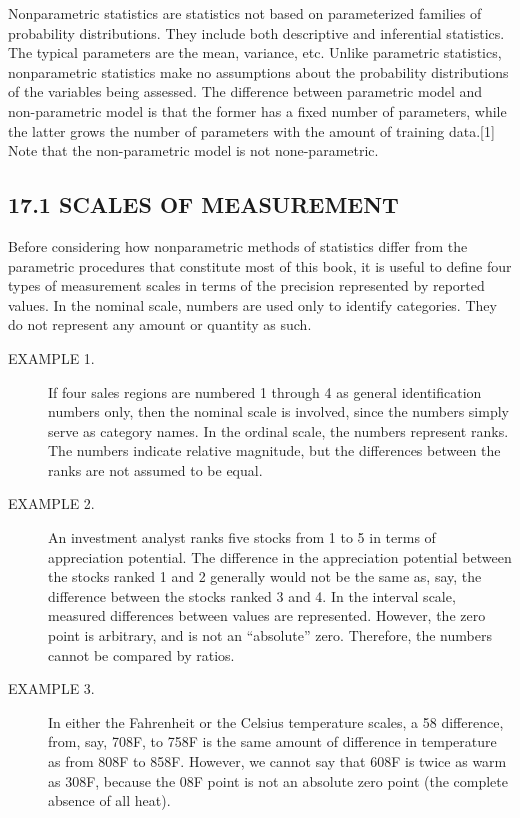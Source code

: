 Nonparametric statistics are statistics not based on parameterized families of probability distributions. 
They include both descriptive and inferential statistics. The typical parameters are the mean, variance, etc. Unlike parametric statistics, nonparametric statistics make no assumptions about the probability distributions of the variables being assessed. The difference between parametric model and non-parametric model is that the former has a fixed number of parameters, while the latter grows the number of parameters with the amount of training data.[1] Note that the non-parametric model is not none-parametric.


\subsection{17.1 SCALES OF MEASUREMENT}
Before considering how nonparametric methods of statistics differ from the parametric procedures that
constitute most of this book, it is useful to define four types of measurement scales in terms of the precision
represented by reported values.
In the nominal scale, numbers are used only to identify categories. They do not represent any amount or
quantity as such.
\begin{description}
\item[EXAMPLE 1.] If four sales regions are numbered 1 through 4 as general identification numbers only, then the nominal
scale is involved, since the numbers simply serve as category names.
In the ordinal scale, the numbers represent ranks. The numbers indicate relative magnitude, but the
differences between the ranks are not assumed to be equal.
\item[EXAMPLE 2.] An investment analyst ranks five stocks from 1 to 5 in terms of appreciation potential. The difference in the
appreciation potential between the stocks ranked 1 and 2 generally would not be the same as, say, the difference between the
stocks ranked 3 and 4.
In the interval scale, measured differences between values are represented. However, the zero point is
arbitrary, and is not an “absolute” zero. Therefore, the numbers cannot be compared by ratios.
\item[EXAMPLE 3.] In either the Fahrenheit or the Celsius temperature scales, a 58 difference, from, say, 708F, to 758F is the
same amount of difference in temperature as from 808F to 858F. However, we cannot say that 608F is twice as warm as 308F,
because the 08F point is not an absolute zero point (the complete absence of all heat).
\end{description}
